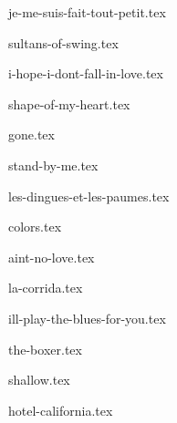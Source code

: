 \begin{songs}{}

  {je-me-suis-fait-tout-petit.tex}
  \sclearpage

  {sultans-of-swing.tex}
  \sclearpage

  {i-hope-i-dont-fall-in-love.tex}
  \sclearpage

  {shape-of-my-heart.tex}
  \sclearpage

  {gone.tex}
  \sclearpage

  {stand-by-me.tex}
  \sclearpage

  {les-dingues-et-les-paumes.tex}
  \sclearpage

  {colors.tex}
  \sclearpage

  {aint-no-love.tex}
  \sclearpage

  {la-corrida.tex}
  \sclearpage

  {ill-play-the-blues-for-you.tex}
  \sclearpage

  {the-boxer.tex}
  \sclearpage

  {shallow.tex}
  \sclearpage

  {hotel-california.tex}
  \sclearpage

 \end{songs}
